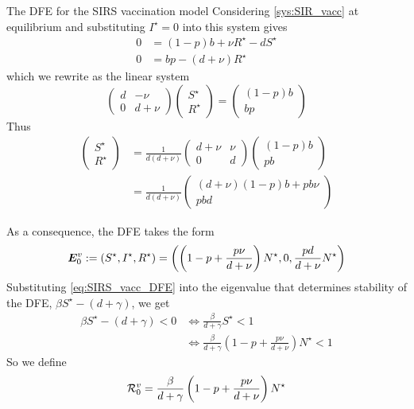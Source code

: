 \documentclass[aspectratio=169]{beamer}\usepackage[]{graphicx}\usepackage[]{xcolor}
\begin{document}
\begin{frame}{The DFE for the SIRS vaccination model}
Considering \eqref{sys:SIR_vacc} at equilibrium and substituting $I^\star=0$ into this system gives
\begin{align*}
0 &= (1-p)b+\nu R^\star-dS^\star \\
0 &= bp-(d+\nu)R^\star
\end{align*}
which we rewrite as the linear system
\[
\begin{pmatrix}
d & -\nu \\ 0 & d+\nu
\end{pmatrix}
\begin{pmatrix}
S^\star \\ R^\star
\end{pmatrix}
=
\begin{pmatrix}
(1-p)b \\ bp
\end{pmatrix}
\]
Thus
\begin{align*}
\begin{pmatrix}
S^\star \\ R^\star
\end{pmatrix}
&= \frac{1}{d(d+\nu)}
\begin{pmatrix}
d+\nu & \nu \\ 0 & d
\end{pmatrix}
\begin{pmatrix}
(1-p)b \\ pb
\end{pmatrix} \\
&= \frac{1}{d(d+\nu)}
\begin{pmatrix}
(d+\nu)(1-p)b+pb\nu \\ pbd
\end{pmatrix}
\end{align*}
\end{frame}

\begin{frame}
As a consequence, the DFE takes the form
\begin{equation}\label{eq:SIRS_vacc_DFE}
\bm{E}_0^v := (S^\star,I^\star,R^\star) =
\left(
\left(1-p+\frac{p\nu}{d+\nu}\right)N^\star,0,
\frac{pd}{d+\nu}N^\star
\right)
\end{equation}
\vfill
Substituting \eqref{eq:SIRS_vacc_DFE} into the eigenvalue that determines stability of the DFE, $\beta S^\star-(d+\gamma)$, we get
\begin{align*}
\beta S^\star-(d+\gamma)<0 &\iff
\frac\beta{d+\gamma} S^\star <1 \\
&\iff 
\frac\beta{d+\gamma}
\left(1-p+\frac{p\nu}{d+\nu}\right)N^\star<1
\end{align*}
So we define
\begin{equation}\label{eq:SIRS_vacc_R0}
\mathcal{R}_0^v =
\frac\beta{d+\gamma}
\left(1-p+\frac{p\nu}{d+\nu}\right)N^\star
\end{equation}
\end{frame}
\end{document}

